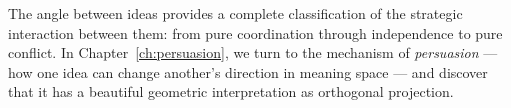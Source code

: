 \bigskip

The angle between ideas provides a complete classification of the strategic
interaction between them: from pure coordination through independence to pure
conflict. In Chapter~\ref{ch:persuasion}, we turn to the mechanism of
\emph{persuasion} --- how one idea can change another's direction in meaning
space --- and discover that it has a beautiful geometric interpretation as
orthogonal projection.

